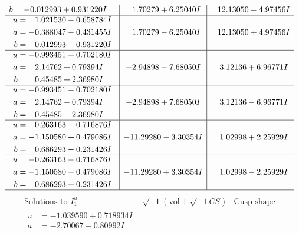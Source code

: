 \documentclass[1p]{elsarticle_modified}
\theoremstyle{definition}
\newcommand{\I}{\sqrt{-1}}
\begin{document}
$$\begin{array}{c|c|c}
\begin{aligned}
b &= -0.012993 + 0.931220 I\end{aligned}
 & \phantom{-}1.70279 + 6.25040 I & \phantom{-}12.13050 - 4.97456 I \\ \hline\begin{aligned}
u &= \phantom{-}1.021530 - 0.658784 I \\
a &= -0.388047 - 0.431455 I \\
b &= -0.012993 - 0.931220 I\end{aligned}
 & \phantom{-}1.70279 - 6.25040 I & \phantom{-}12.13050 + 4.97456 I \\ \hline\begin{aligned}
u &= -0.993451 + 0.702180 I \\
a &= \phantom{-}2.14762 + 0.79394 I \\
b &= \phantom{-}0.45485 + 2.36980 I\end{aligned}
 & -2.94898 - 7.68050 I & \phantom{-}3.12136 + 6.96771 I \\ \hline\begin{aligned}
u &= -0.993451 - 0.702180 I \\
a &= \phantom{-}2.14762 - 0.79394 I \\
b &= \phantom{-}0.45485 - 2.36980 I\end{aligned}
 & -2.94898 + 7.68050 I & \phantom{-}3.12136 - 6.96771 I \\ \hline\begin{aligned}
u &= -0.263163 + 0.716876 I \\
a &= -1.150580 + 0.479086 I \\
b &= \phantom{-}0.686293 - 0.231426 I\end{aligned}
 & -11.29280 - 3.30354 I & \phantom{-}1.02998 + 2.25929 I \\ \hline\begin{aligned}
u &= -0.263163 - 0.716876 I \\
a &= -1.150580 - 0.479086 I \\
b &= \phantom{-}0.686293 + 0.231426 I\end{aligned}
 & -11.29280 + 3.30354 I & \phantom{-}1.02998 - 2.25929 I\\
 \hline 
 \end{array}$$\newpage$$\begin{array}{c|c|c}  
\text{Solutions to }I^u_{1}& \I (\text{vol} + \sqrt{-1}CS) & \text{Cusp shape}\\
 \hline 
\begin{aligned}
u &= -1.039590 + 0.718934 I \\
a &= -2.70067 - 0.80992 I \\

\end{aligned}
\end{array}$$
\end{document}
